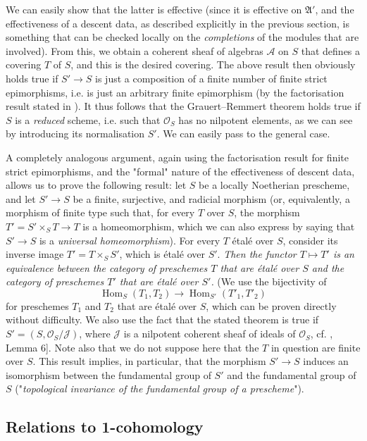 We can easily show that the latter is effective (since it is effective on $\mathfrak{A}'$, and the effectiveness of a descent data, as described explicitly in the previous section, is something that can be checked locally on the \emph{completions} of the modules that are involved).
From this, we obtain a coherent sheaf of algebras $\mathcal{A}$ on $S$ that defines a covering $T$ of $S$, and this is the desired covering.
The above result then obviously holds true if $S'\to S$ is just a composition of a finite number of finite strict epimorphisms, i.e. is just an arbitrary finite epimorphism (by the factorisation result stated in ).
It thus follows that the Grauert–Remmert theorem holds true if $S$ is a \emph{reduced} scheme, i.e. such that $\mathcal{O}_S$ has no nilpotent elements, as we can see by introducing its normalisation $S'$.
We can easily pass to the general case.



A completely analogous argument, again using the factorisation result for finite strict epimorphisms, and the "formal" nature of the effectiveness of descent data, allows us to prove the following result:
let $S$ be a locally Noetherian prescheme, and let $S'\to S$ be a finite, surjective, and radicial morphism (or, equivalently, a morphism of finite type such that, for every $T$ over $S$, the morphism $T'=S'\times_S T\to T$ is a homeomorphism, which we can also express by saying that $S'\to S$ is a \emph{universal homeomorphism}).
For every $T$ étalé over $S$, consider its inverse image $T'=T\times_S S'$, which is étalé over $S'$.
\emph{Then the functor $T\mapsto T'$ is an equivalence between the category of preschemes $T$ that are étalé over $S$ and the category of preschemes $T'$ that are étalé over $S'$.}
(We use the bijectivity of
\[
    \operatorname{Hom}_S(T_1,T_2) \to \operatorname{Hom}_{S'}(T'_1,T'_2)
\]
for preschemes $T_1$ and $T_2$ that are étalé over $S$, which can be proven directly without difficulty. We also use the fact that the stated theorem is true if $S'=(S,\mathcal{O}_S/\mathcal{J})$, where $\mathcal{J}$ is a nilpotent coherent sheaf of ideals of $\mathcal{O}_S$, cf. \cite{Mur1958}, Lemma 6].
Note also that we do not suppose here that the $T$ in question are finite over $S$.
This result implies, in particular, that the morphism $S'\to S$ induces an isomorphism between the fundamental group of $S'$ and the fundamental group of $S$ ("\emph{topological invariance of the fundamental group of a prescheme}").

\subsection{Relations to 1-cohomology}\label{fga3.i-a.4}

